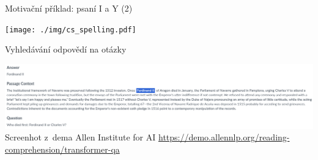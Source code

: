 \documentclass[handout,aspectratio=169,dvipsnames]{beamer}
\begin{document}

\begin{frame}{Motivační příklad: psaní I a Y (2)}

    \centering
    \texttt{[image: ./img/cs\_spelling.pdf]}


\end{frame}


\begin{frame}{Vyhledávání odpovědí na otázky}

    \centering
    \includegraphics[scale=.26]{img/qa.png} \\
    {\tiny Screenhot z~dema Allen Institute for AI \url{https://demo.allennlp.org/reading-comprehension/transformer-qa}}

\end{frame}

\end{document}
